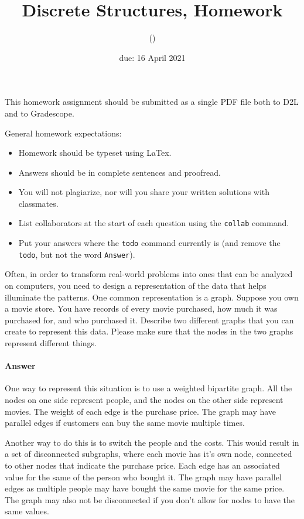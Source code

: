 \documentclass{article}
\title{Discrete Structures, Homework \hwnum}
\author{\todo{Your Name Here} (\todo{your discord handle here})}
\date{due: 16 April 2021}
\begin{document}
\maketitle

This homework assignment should be
submitted as a single PDF file both to D2L and to Gradescope.

General homework expectations:
\begin{itemize}
    \item Homework should be typeset using LaTex.
    \item Answers should be in complete sentences and proofread.
    \item You will not plagiarize, nor will you share your written solutions
        with classmates.
    \item List collaborators at the start of each question using the \texttt{collab} command.
    \item Put your answers where the \texttt{todo} command currently is (and
        remove the \texttt{todo}, but not the word \texttt{Answer}).
\end{itemize}


\collab{\todo{}} 

Often, in order to transform real-world problems into ones that can be analyzed
on computers, you need to design a representation of the data that helps
illuminate the patterns.  One common representation is a graph.  Suppose you own
a movie store.  You have records of every movie purchased, how much it was
purchased for, and who purchased it.  Describe two different graphs that you can
create to represent this data.  Please make sure that the nodes in the two
graphs represent different things.

\paragraph{Answer}

One way to represent this situation is to use a weighted bipartite graph. All the nodes on one side represent people, and the nodes on the other side represent movies. The weight of each edge is the purchase price. The graph may have parallel edges if customers can buy the same movie multiple times.

Another way to do this is to switch the people and the costs. This would result in a set of disconnected subgraphs, where each movie has it's own node, connected to other nodes that indicate the purchase price. Each edge has an associated value for the same of the person who bought it. The graph may have parallel edges as multiple people may have bought the same movie for the same price. The graph may also not be disconnected if you don't allow for nodes to have the same values.
\end{document}
